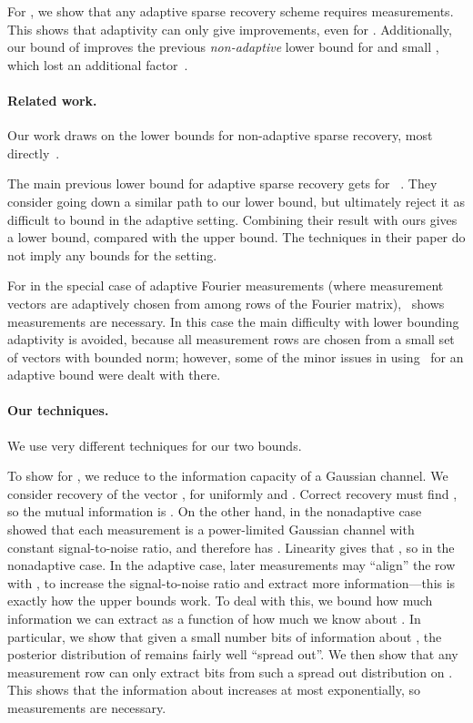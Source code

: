 \documentclass[twoside,leqno,twocolumn]{article}
\begin{document}
For , we show that any adaptive sparse recovery scheme requires
 measurements. This shows that
adaptivity can only give  improvements, even for .  Additionally, our bound of  improves the previous \emph{non-adaptive} lower
bound for  and small , which lost an additional 
factor~\cite{PW11}.

\paragraph{Related work.} Our work draws on the lower bounds for
non-adaptive sparse recovery, most directly~\cite{PW11}.

The main previous lower bound for adaptive sparse recovery gets  for ~\cite{ACD11}.  They consider going down a
similar path to our  lower bound, but ultimately
reject it as difficult to bound in the adaptive setting.  Combining
their result with ours gives a 
lower bound, compared with the 
upper bound. The techniques in their paper do not imply any bounds for
the  setting.

For  in the special case of adaptive Fourier measurements (where
measurement vectors are adaptively chosen from among  rows of the
Fourier matrix),~\cite{HIKP12} shows  measurements are necessary.  In this case the main difficulty with
lower bounding adaptivity is avoided, because all measurement rows are
chosen from a small set of vectors with bounded  norm;
however, some of the minor issues in using~\cite{PW11} for an adaptive
bound were dealt with there.

\paragraph{Our techniques.}  We use very different techniques for our
two bounds.

To show  for , we reduce to the information
capacity of a Gaussian channel.  We consider recovery of the vector , for  uniformly and .  Correct recovery must find , so the mutual
information  is .  On the other hand, in
the nonadaptive case~\cite{PW11} showed that each measurement 
is a power-limited Gaussian channel with constant signal-to-noise
ratio, and therefore has .  Linearity gives that
, so  in the nonadaptive case.
In the adaptive case, later measurements may ``align'' the row 
with , to increase the signal-to-noise ratio and extract more
information---this is exactly how the upper bounds work.  To deal with
this, we bound how much information we can extract as a function of
how much we know about .  In particular, we show that given a
small number  bits of information about , the posterior
distribution of  remains fairly well ``spread out''.  We then
show that any measurement row  can only extract  bits
from such a spread out distribution on .  This shows that the
information about  increases at most exponentially, so
 measurements are necessary.
\end{document}
